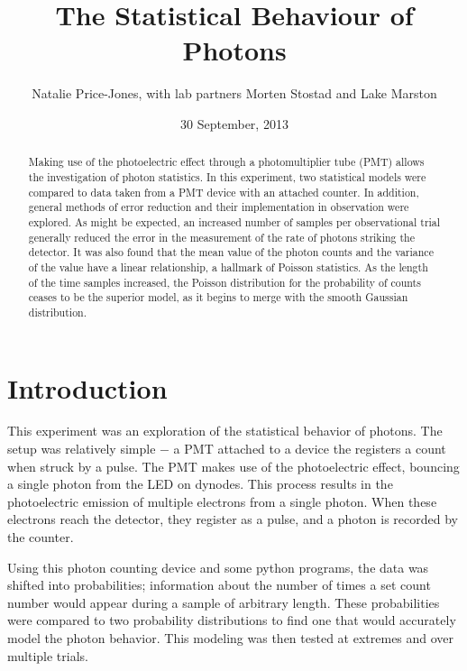 \documentclass[a4paper,12pt]{article}
\begin{document}
\onehalfspacing
\title{The Statistical Behaviour of Photons}
\author{Natalie Price-Jones, with lab partners Morten Stostad and Lake Marston}
\date{30 September, 2013}
\maketitle

\begin{abstract}
\label{abstract}

Making use of the photoelectric effect through a photomultiplier tube (PMT) allows the investigation of photon statistics. In this experiment, two statistical models were compared to data taken from a PMT device with an attached counter. In addition, general methods of error reduction and their implementation in observation were explored. As might be expected, an increased number of samples per observational trial generally reduced the error in the measurement of the rate of photons striking the detector. It was also found that the mean value of the photon counts and the variance of the value have a linear relationship, a hallmark of Poisson statistics. As the length of the time samples increased, the Poisson distribution for the probability of counts ceases to be the superior model, as it begins to merge with the smooth Gaussian distribution.

\end{abstract}

\section{Introduction}
\label{sec:introduction}

This experiment was an exploration of the statistical behavior of photons. The setup was relatively simple $-$ a PMT attached to a device the registers a count when struck by a pulse. The PMT makes use of the photoelectric effect, bouncing a single photon from the LED on dynodes. This process results in the photoelectric emission of multiple electrons from a single photon. When these electrons reach the detector, they register as a pulse, and a photon is recorded by the counter.

Using this photon counting device and some python programs, the data was shifted into probabilities; information about the number of times a set count number would appear during a sample of arbitrary length. These probabilities were compared to two probability distributions to find one that would accurately model the photon behavior. This modeling was then tested at extremes and over multiple trials.
\end{document}
